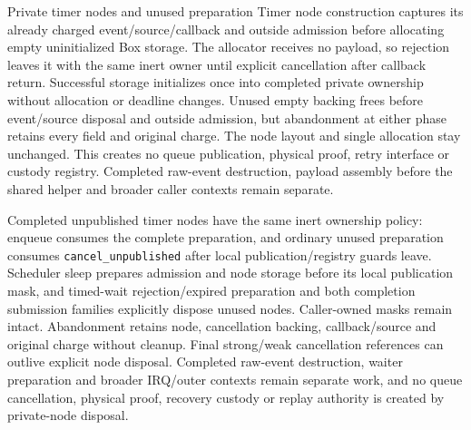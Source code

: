 \begin{implementationdetail}{Private timer nodes and unused preparation}
Timer node construction captures its already charged event/source/callback and
outside admission before allocating empty uninitialized Box storage. The
allocator receives no payload, so rejection leaves it with the same inert owner
until explicit cancellation after callback return. Successful storage initializes
once into completed private ownership without allocation or deadline changes.
Unused empty backing frees before event/source disposal and outside admission, but
abandonment at either phase retains every field and original charge. The node
layout and single allocation stay unchanged. This creates no queue publication,
physical proof, retry interface or custody registry. Completed raw-event
destruction, payload assembly before the shared helper and broader
caller contexts remain separate.

Completed unpublished timer nodes have the same inert ownership policy:
enqueue consumes the complete preparation, and ordinary unused preparation
consumes \texttt{cancel\_unpublished} after local publication/registry guards
leave. Scheduler sleep prepares admission and node storage before its local
publication mask, and timed-wait rejection/expired preparation and both completion
submission families explicitly dispose unused nodes. Caller-owned masks remain
intact. Abandonment retains node, cancellation backing, callback/source and
original charge without cleanup. Final strong/weak cancellation references can
outlive explicit node disposal. Completed raw-event destruction,
waiter preparation and broader IRQ/outer contexts remain separate work, and no
queue cancellation, physical proof, recovery custody or replay authority is
created by private-node disposal.
\end{implementationdetail}

